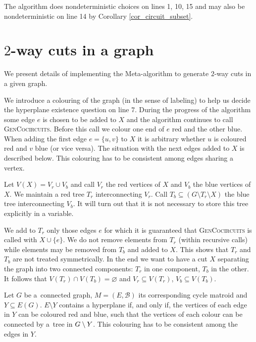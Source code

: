 
\begin{rem}
	The algorithm does nondeterministic choices on lines 1, 10, 15 and may also be nondeterministic on line 14 by Corollary \ref{cor_circuit_subset}.
\end{rem}

\section{$2$-way cuts in a graph}

We present details of implementing the Meta-algorithm to generate $2$-way cuts in a given graph.

We introduce a colouring of the graph (in the sense of labeling) to help us decide the hyperplane existence question on line 7. During the progress of the algorithm some edge $e$ is chosen to be added to $X$ and the algorithm continues to call \textsc{GenCocircuits}. Before this call we colour one end of $e$ red and the other blue. When adding the first edge $e = \{u ,v\}$ to $X$ it is arbitrary whether $u$ is coloured red and $v$ blue (or vice versa). The situation with the next edges added to $X$ is described below. This colouring has to be consistent among edges sharing a vertex.

Let $V(X) = V_r \cup V_b$ and call $V_r$ the red vertices of $X$ and $V_b$ the blue vertices of $X$. We maintain a red tree $T_r$ interconnecting $V_r$. Call ${T_b \subseteq (G \setminus T_r \setminus X)}$ the blue tree interconnecting $V_b$. It will turn out that it is not necessary to store this tree explicitly in a variable.

We add to $T_r$ only those edges $e$ for which it is guaranteed that \textsc{GenCocircuits} is called with $X \cup \{e\}$. We do not remove elements from $T_r$ (within recursive calls) while elements may be removed from $T_b$ and added to $X$. This shows that $T_r$ and $T_b$ are not treated symmetrically. In the end we want to have a cut $X$ separating the graph into two connected components: $T_r$ in one component, $T_b$ in the other. It follows that $V(T_r) \cap V(T_b) = \varnothing$ and $V_r \subseteq V(T_r)$, $V_b \subseteq V(T_b)$.

\begin{lem}
	\label{lem:hyperplane_existence}
	Let $G$ be a~connected graph, $M = (E, \mathcal{B})$ its corresponding cycle matroid and $Y \subseteq E(G)$. $E \setminus Y$ contains a hyperplane if, and only if, the vertices of each edge in $Y$ can be coloured red and blue, such that the vertices of each colour can be connected by a~tree in $G \setminus Y$. This colouring has to be consistent among the edges in $Y$.
\end{lem}


